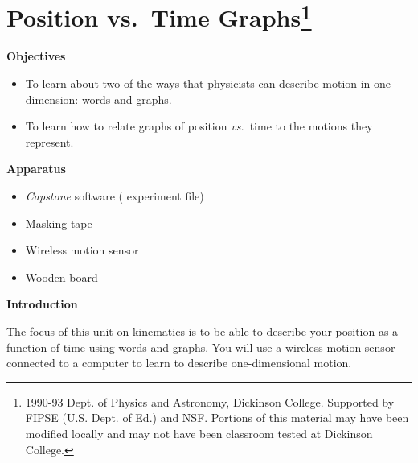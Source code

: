 
\section{Position vs.~Time Graphs\footnote{
1990-93 Dept. of Physics and Astronomy, Dickinson College. Supported by FIPSE
(U.S. Dept. of Ed.) and NSF. Portions of this material may have been modified
locally and may not have been classroom tested at Dickinson College.
}}


\makelabheader %

\bigskip

\textbf{Objectives} 

\begin{itemize}[nosep]
\item To learn about two of the ways that physicists can describe motion in one dimension: words and graphs. 
\item To learn how to relate graphs of position \textit{vs.}~time to the motions they represent.
\end{itemize}

\bigskip

\textbf{Apparatus} 

\begin{itemize}[nosep]
\item \textit{Capstone} software ( experiment file) 
\item Masking tape
\item Wireless motion sensor
\item Wooden board
\end{itemize}

\bigskip

\textbf{Introduction} 

The focus of this unit on kinematics is to be able to describe your position
as a function of time using words and graphs. You will use a wireless motion sensor
connected to a computer to learn to describe one-dimensional motion.


